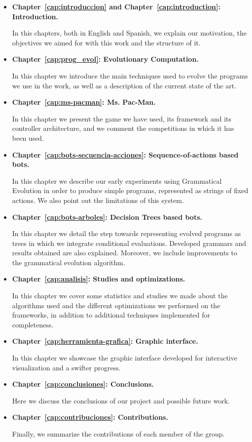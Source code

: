\begin{itemize}
\item \textbf{Chapter~\ref{cap:introduccion} and Chapter~\ref{cap:introduction}: Introduction.}

In this chapters, both in English and Spanish, we explain our motivation, the objectives we aimed for with this work and the structure of it.

\item \textbf{Chapter~\ref{cap:prog_evol}: Evolutionary Computation.}

In this chapter we introduce the main techniques used to evolve the programs we use in the work, as well as a description of the current state of the art.

\item \textbf{Chapter~\ref{cap:ms-pacman}: Ms. Pac-Man.}

In this chapter we present the game we have used, its framework and its controller architecture, and we comment the competitions in which it has been used.

\item \textbf{Chapter~\ref{cap:bots-secuencia-acciones}: Sequence-of-actions based bots.}

In this chapter we describe our early experiments using Grammatical Evolution in order to produce simple programs, represented as strings of fixed actions. We also point out the limitations of this system.

\item \textbf{Chapter~\ref{cap:bots-arboles}: Decision Trees based bots.}

In this chapter we detail the step towards representing evolved programs as trees in which we integrate conditional evaluations. Developed grammars and results obtained are also explained. Moreover, we include improvements to the grammatical evolution algorithm.

\item \textbf{Chapter~\ref{cap:analisis}: Studies and optimizations.}

In this chapter we cover some statistics and studies we made about the algorithms used and the different optimizations we performed on the frameworks, in addition to additional techniques implemented for completeness.

\item \textbf{Chapter~\ref{cap:herramienta-grafica}: Graphic interface.}

In this chapter we showcase the graphic interface developed for interactive visualization and a swifter progress.

\item \textbf{Chapter~\ref{cap:conclusiones}: Conclusions.}

Here we discuss the conclusions of our project and possible future work.

\item \textbf{Chapter~\ref{cap:contribuciones}: Contributions.}

Finally, we summarize the contributions of each member of the group.

\end{itemize}
